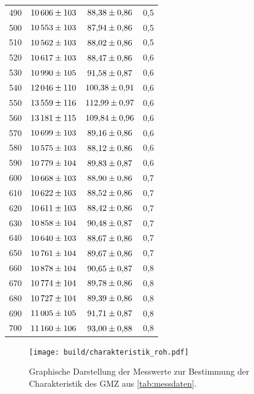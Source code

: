 \begin{longtable}{c c c c}
    490 & $\num{10606+-103}$ & $\num{ 88.38+-0.86}$ & 0,5 \\
    500 & $\num{10553+-103}$ & $\num{ 87.94+-0.86}$ & 0,5 \\
    510 & $\num{10562+-103}$ & $\num{ 88.02+-0.86}$ & 0,5 \\
    520 & $\num{10617+-103}$ & $\num{ 88.47+-0.86}$ & 0,6 \\
    530 & $\num{10990+-105}$ & $\num{ 91.58+-0.87}$ & 0,6 \\
    540 & $\num{12046+-110}$ & $\num{100.38+-0.91}$ & 0,6 \\
    550 & $\num{13559+-116}$ & $\num{112.99+-0.97}$ & 0,6 \\
    560 & $\num{13181+-115}$ & $\num{109.84+-0.96}$ & 0,6 \\
    570 & $\num{10699+-103}$ & $\num{ 89.16+-0.86}$ & 0,6 \\
    580 & $\num{10575+-103}$ & $\num{ 88.12+-0.86}$ & 0,6 \\
    590 & $\num{10779+-104}$ & $\num{ 89.83+-0.87}$ & 0,6 \\
    600 & $\num{10668+-103}$ & $\num{ 88.90+-0.86}$ & 0,7 \\
    610 & $\num{10622+-103}$ & $\num{ 88.52+-0.86}$ & 0,7 \\
    620 & $\num{10611+-103}$ & $\num{ 88.42+-0.86}$ & 0,7 \\
    630 & $\num{10858+-104}$ & $\num{ 90.48+-0.87}$ & 0,7 \\
    640 & $\num{10640+-103}$ & $\num{ 88.67+-0.86}$ & 0,7 \\
    650 & $\num{10761+-104}$ & $\num{ 89.67+-0.86}$ & 0,7 \\
    660 & $\num{10878+-104}$ & $\num{ 90.65+-0.87}$ & 0,8 \\
    670 & $\num{10774+-104}$ & $\num{ 89.78+-0.86}$ & 0,8 \\
    680 & $\num{10727+-104}$ & $\num{ 89.39+-0.86}$ & 0,8 \\
    690 & $\num{11005+-105}$ & $\num{ 91.71+-0.87}$ & 0,8 \\
    700 & $\num{11160+-106}$ & $\num{ 93.00+-0.88}$ & 0,8 \\
    \bottomrule
\end{longtable}

\begin{figure}[H]
    \centering
    \texttt{[image: build/charakteristik\_roh.pdf]}
    \caption{Graphische Darstellung der Messwerte zur Bestimmung der Charakteristik des GMZ aus%
    \autoref{tab:messdaten}.}
    \label{fig:charakteristik_roh}
\end{figure}

